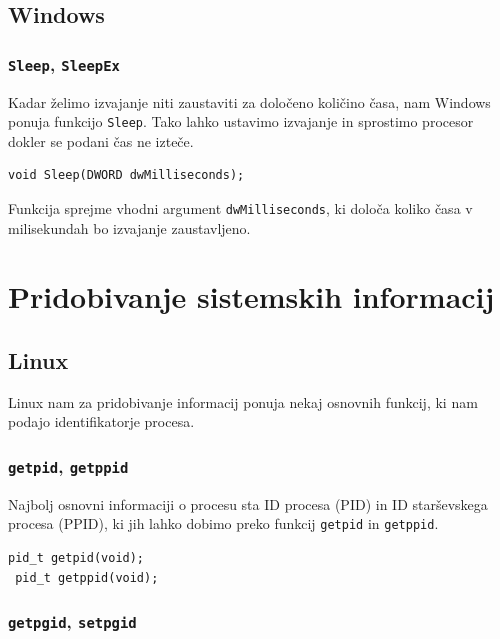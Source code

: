 \documentclass[a4paper,12pt,openright]{book}
\begin{document}
\subsection{Windows}

\subsubsection{\texttt{Sleep}, \texttt{SleepEx}}

Kadar želimo izvajanje niti zaustaviti za določeno količino časa, nam Windows ponuja funkcijo \texttt{Sleep}.
Tako lahko ustavimo izvajanje in sprostimo procesor dokler se podani čas ne izteče.

\begin{lstlisting}[style=func]
 void Sleep(DWORD dwMilliseconds);
\end{lstlisting}

Funkcija sprejme vhodni argument \texttt{dwMilliseconds}, ki določa koliko časa v milisekundah bo izvajanje zaustavljeno.

\section{Pridobivanje sistemskih informacij}

\subsection{Linux}

Linux nam za pridobivanje informacij ponuja nekaj osnovnih funkcij, ki nam podajo identifikatorje procesa.

\subsubsection{\texttt{getpid}, \texttt{getppid}}

Najbolj osnovni informaciji o procesu sta ID procesa (PID) in ID starševskega procesa (PPID), ki jih lahko dobimo preko funkcij \texttt{getpid} in \texttt{getppid}.

\begin{lstlisting}[style=func]
 pid_t getpid(void);
 pid_t getppid(void);
\end{lstlisting}

\subsubsection{\texttt{getpgid}, \texttt{setpgid}}
\end{document}
